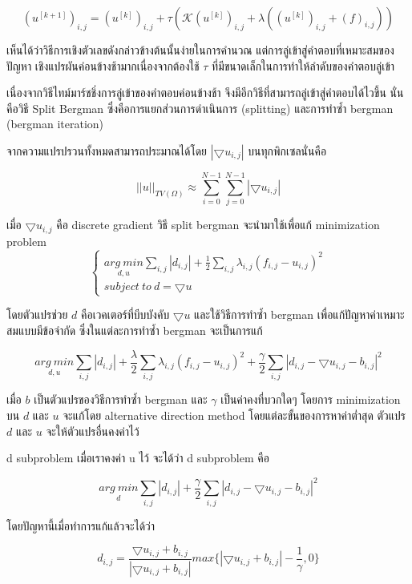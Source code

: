 \documentclass[hidelinks,a4paper,14pt]{article}
\numberwithin{equation}{section}							%
\begin{document}
{		$$ (u^{[k+1]})_{i,j} = (u^{[k]})_{i,j}+\tau\left(  \mathcal{K}(u^{[k]})_{i,j}+\lambda((u^{[k]})_{i,j}+(f)_{i,j})\right) $$
		
		เห็นได้ว่าวิธีการเชิงตัวเลขดังกล่าวข้างต้นนั้นง่ายในการคํานวณ แต่การลู่เข้าสู่คําตอบที่เหมาะสมของปัญหา เชิงแปรผันค่อนข้างช้ามากเนื่องจากต้องใช้ $\tau$ ที่มีขนาดเล็กในการทำให้ลำดับของคำตอบลู่เข้า 
	
		เนื่องจากวิธีไทม์มาร์ชชิ่งการลู่เข้าของคำตอบค่อนข้างช้า จึงมีอีกวิธีที่สามารถลู่เข้าสู่คำตอบได้ไวขึ้น  นั่นคือวิธี Split Bergman \cite{ref:splitbergman-inpaint} ซึ่งคือการแยกส่วนการดำเนินการ (splitting) และการทำซ้ำ bergman (bergman iteration)
		
		จากความแปรปรวนทั้งหมดสามารถประมาณได้โดย $ |\bigtriangledown u_{i,j} | $ บนทุกพิกเซลนั่นคือ
		
		$$ ||u||_{TV(\Omega)} \approx \sum_{i=0}^{N-1} \sum_{j=0}^{N-1} |\bigtriangledown u_{i,j}| $$
		
		เมื่อ $\bigtriangledown u_{i,j}$  คือ discrete gradient วิธี split bergman  จะนำมาใช้เพื่อแก้ minimization problem 
		$$
		\left\{ \begin{array}{lc} 
		\underset{d , u}{arg \ min}\sum_{i,j}|d_{i,j}|+\frac{1}{2}\sum_{i,j}\lambda_{i,j}(f_{i,j} - u_{i,j})^2 \\
		subject \ to \ d = \bigtriangledown u 
		\end{array} \right .
		$$
		
		โดยตัวแปรช่วย $d$  คือเวคเตอร์ที่บีบบังคับ $ \bigtriangledown u$ และใช้วิธีการทำซ้ำ bergman เพื่อแก้ปัญหาค่าเหมาะสมแบบมีข้อจำกัด ซึ่งในแต่ละการทำซ้ำ bergman จะเป็นการแก้
		
		$$\underset{d , u}{arg \ min}\sum_{i,j}|d_{i,j}|+\frac{\lambda}{2}\sum_{i,j}\lambda_{i,j}(f_{i,j} - u_{i,j})^2 + \frac{\gamma}{2} \sum_{i,j} |d_{i,j} - \bigtriangledown u_{i,j}- b_{i,j}|^2 $$
		
		เมื่อ $b$  เป็นตัวแปรของวิธีการทำซ้ำ bergman และ $\gamma$ เป็นค่าคงที่บวกใดๆ โดยการ minimization  บน $d$ และ $u$  จะแก้โดย alternative direction method โดยแต่ละขั้นของการหาค่าต่ำสุด ตัวแปร $d$ และ $u$ จะให้ตัวแปรอื่นคงค่าไว้
		
		d subproblem เมื่อเราคงค่า u ไว้ จะได้ว่า d subproblem คือ
		
		$$ \underset{d}{arg \ min} \sum_{i,j} |d_{i,j}| + \frac{\gamma}{2} \sum_{i,j}|d_{i,j} - \bigtriangledown u_{i,j} - b_{i,j}|^2$$
		
		โดยปัญหานี้เมื่อทำการแก้แล้วจะได้ว่า 
		
		$$ d_{i,j} = \frac{\bigtriangledown u_{i,j}  + b_{i,j} }{ | \bigtriangledown u_{i,j}  + b_{i,j} | } max \{  | \bigtriangledown u_{i,j}  + b_{i,j} | - \frac{1}{\gamma} , 0\} $$
		
}
\end{document}
